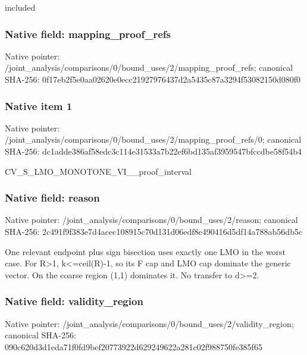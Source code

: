 \documentclass[10pt,a4paper]{article}
\begin{document}
\begingroup\raggedright\sloppy included\par\endgroup

\subsubsection{Native field: mapping\_\allowbreak{}proof\_\allowbreak{}refs}
Native pointer: /joint\_\allowbreak{}analysis/comparisons/0/bound\_\allowbreak{}uses/2/mapping\_\allowbreak{}proof\_\allowbreak{}refs; canonical SHA-256: 0f17eb2f5e0aa02620e0ecc21927976437d2a5435c87a3294f53082150d080f0

\subsubsection{Native item 1}
Native pointer: /joint\_\allowbreak{}analysis/comparisons/0/bound\_\allowbreak{}uses/2/mapping\_\allowbreak{}proof\_\allowbreak{}refs/0; canonical SHA-256: dc1adde386af58edc3c114e31533a7b22ef6bd135af3959547bfccdbe58f54b4

\begingroup\raggedright\sloppy CV\_\allowbreak{}S\_\allowbreak{}LMO\_\allowbreak{}MONOTONE\_\allowbreak{}VI\_\allowbreak{}\_\allowbreak{}proof\_\allowbreak{}interval\par\endgroup

\subsubsection{Native field: reason}
Native pointer: /joint\_\allowbreak{}analysis/comparisons/0/bound\_\allowbreak{}uses/2/reason; canonical SHA-256: 2c491f9f383e7d4acec108915c70d131d06edf8e490416d5df14a788ab56db5c

\begingroup\raggedright\sloppy One relevant endpoint plus sign bisection uses exactly one LMO in the worst case. For R>1,\allowbreak{} k<=\allowbreak{}ceil(R)-1,\allowbreak{} so its F cap and LMO cap dominate the generic vector. On the coarse region (1,\allowbreak{}1) dominates it. No transfer to d>=\allowbreak{}2.\par\endgroup

\subsubsection{Native field: validity\_\allowbreak{}region}
Native pointer: /joint\_\allowbreak{}analysis/comparisons/0/bound\_\allowbreak{}uses/2/validity\_\allowbreak{}region; canonical SHA-256: 090c620d3d1eda71f0fd9bef20773922d629249622a281c02f988750fe385f65
\end{document}
